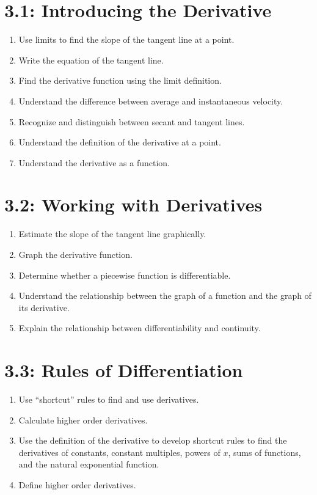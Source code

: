 \documentclass[11pt]{article}
\begin{document}
\section*{3.1: Introducing the Derivative}
\begin{enumerate}
	\item Use limits to find the slope of the tangent line at a point.
	\item Write the equation of the tangent line.
	\item Find the derivative function using the limit definition.
	\item Understand the difference between average and instantaneous velocity.
	\item Recognize and distinguish between secant and tangent lines.
	\item Understand the definition of the derivative at a point.
	\item Understand the derivative as a function.
\end{enumerate}

\section*{3.2: Working with Derivatives}
\begin{enumerate}
	\item Estimate the slope of the tangent line graphically.
	\item Graph the derivative function.
	\item Determine whether a piecewise function is differentiable.
	\item Understand the relationship between the graph of a function and the graph of its derivative.
	\item Explain the relationship between differentiability and continuity.
\end{enumerate}

\section*{3.3: Rules of Differentiation}
\begin{enumerate}
	\item Use ``shortcut'' rules to find and use derivatives.
	\item Calculate higher order derivatives.
	\item Use the definition of the derivative to develop shortcut rules to find the derivatives of constants, constant multiples, powers of $x$, sums of functions, and the natural exponential function.
	\item Define higher order derivatives.
\end{enumerate}
\end{document}
